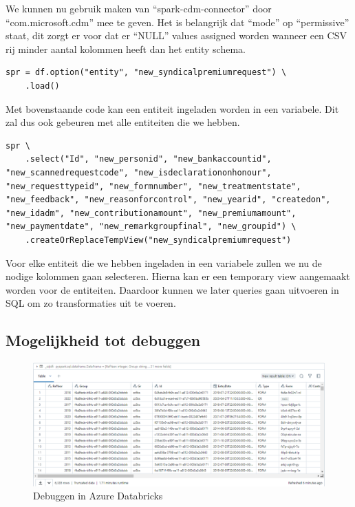 We kunnen nu gebruik maken van ``spark-cdm-connector'' door ``com.microsoft.cdm'' mee te geven. Het is belangrijk dat ``mode'' op ``permissive'' staat, dit zorgt er voor dat er ``NULL'' values assigned worden wanneer een CSV rij minder aantal kolommen heeft dan het entity schema.


\begin{verbatim}
spr = df.option("entity", "new_syndicalpremiumrequest") \
    .load()
\end{verbatim}

Met bovenstaande code kan een entiteit ingeladen worden in een variabele. Dit zal dus ook gebeuren met alle entiteiten die we hebben.


\begin{verbatim}
spr \
    .select("Id", "new_personid", "new_bankaccountid", "new_scannedrequestcode", "new_isdeclarationonhonour", "new_requesttypeid", "new_formnumber", "new_treatmentstate", "new_feedback", "new_reasonforcontrol", "new_yearid", "createdon", "new_idadm", "new_contributionamount", "new_premiumamount", "new_paymentdate", "new_remarkgroupfinal", "new_groupid") \
    .createOrReplaceTempView("new_syndicalpremiumrequest")
\end{verbatim}

Voor elke entiteit die we hebben ingeladen in een variabele zullen we nu de nodige kolommen gaan selecteren. Hierna kan er een temporary view aangemaakt worden voor de entiteiten. Daardoor kunnen we later queries gaan uitvoeren in SQL om zo transformaties uit te voeren.

\subsection{Mogelijkheid tot debuggen}

\begin{figure}[H]
    \centering
    \includegraphics[width=1\textwidth]{./graphics/databricks/debug.png}
    \caption{Debuggen in Azure Databricks}
\end{figure}

